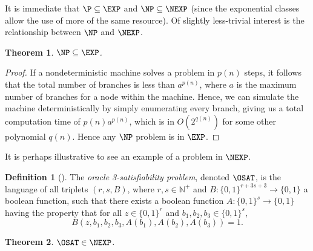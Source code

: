 \documentclass[english,12pt]{reedthesis}
\theoremstyle{plain}
\newtheorem{thm}{Theorem}[section]
\theoremstyle{definition}
\newtheorem{defn}[defn]{Definition}
\theoremstyle{remark}
\begin{document}
It is immediate that $\P \subseteq \EXP$ and $\NP \subseteq \NEXP$ (since the exponential
classes allow the use of more of the same resource). Of slightly less-trivial
interest is the relationship between $\NP$ and $\NEXP$.

\begin{thm}\label{thm:np-exp}
  $\NP \subseteq \EXP$.
\end{thm}

\begin{proof}
  If a nondeterministic machine solves a problem in $p(n)$ steps, it follows
  that the total number of branches is less than $a^{p(n)}$, where $a$ is the
  maximum number of branches for a node within the machine. Hence, we can
  simulate the machine deterministically by simply enumerating every branch,
  giving us a total computation time of $p(n)a^{p(n)}$, which is in
  $O(2^{q(n)})$ for some other polynomial $q(n)$. Hence any $\NP$ problem is in
  $\EXP$.
\end{proof}

It is perhaps illustrative to see an example of a problem in $\NEXP$. %

\begin{defn}[{\cite[Def.\ 14.1]{CFGS22}}]\label{def:oracle-3sat}
  The \emph{oracle 3-satisfiability problem}, denoted $\OSAT$, is the language
  of all triplets $(r, s, B)$, where $r, s \in \mathbb{N}^{+}$ and
  $B\colon \{0, 1\}^{r+3s+3} \rightarrow \{0, 1\}$ a boolean function, such that there
  exists a boolean function $A\colon \{0, 1\}^{s} \rightarrow \{0, 1\}$ having
  the property that for all $z \in \{0, 1\}^{r}$ and
  $b_{1}, b_{2}, b_{3} \in \{0, 1\}^{s}$,
  \begin{equation*}
    B(z, b_{1}, b_{2}, b_{3}, A(b_{1}), A(b_{2}), A(b_{3})) = 1.
  \end{equation*}
\end{defn}

\begin{thm}\label{thm:o3sat-in-nexp}
  $\OSAT \in \NEXP$.
\end{thm}
\end{document}
